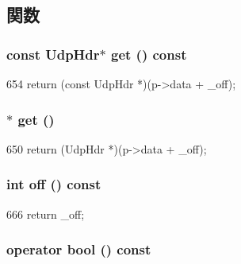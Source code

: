 \subsection{関数}
\hypertarget{classNet_1_1UdpPtr_acdc10278933ff9a5efed69df7bdc4230}{
\subsubsection[{get}]{\setlength{\rightskip}{0pt plus 5cm}const {\bf UdpHdr}$\ast$ get () const}}
\label{classNet_1_1UdpPtr_acdc10278933ff9a5efed69df7bdc4230}



\begin{DoxyCode}
654 { return (const UdpHdr *)(p->data + _off); }
\end{DoxyCode}
\hypertarget{classNet_1_1UdpPtr_a894be408d8fb0e2b4224991c64ed69e0}{
\subsubsection[{get}]{$\ast$ get ()}}
\label{classNet_1_1UdpPtr_a894be408d8fb0e2b4224991c64ed69e0}



\begin{DoxyCode}
650 { return (UdpHdr *)(p->data + _off); }
\end{DoxyCode}
\hypertarget{classNet_1_1UdpPtr_a81fa7ab0c6e92d4496ee915a8a3705f9}{
\subsubsection[{off}]{\setlength{\rightskip}{0pt plus 5cm}int off () const}}
\label{classNet_1_1UdpPtr_a81fa7ab0c6e92d4496ee915a8a3705f9}



\begin{DoxyCode}
666 { return _off; }
\end{DoxyCode}
\hypertarget{classNet_1_1UdpPtr_aa385aa18f5e42db5a415c25a90f4193d}{
\subsubsection[{operator bool}]{\setlength{\rightskip}{0pt plus 5cm}operator bool () const}}
\label{classNet_1_1UdpPtr_aa385aa18f5e42db5a415c25a90f4193d}



